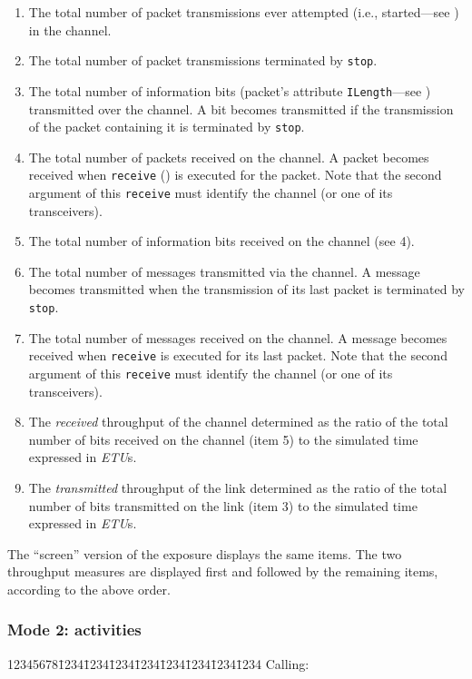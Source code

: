 \begin{enumerate}
\item
The total number of packet transmissions ever attempted (i.e., started---see
) in the channel.
\item
The total number of packet transmissions terminated by {\tt stop}.
\item
The total number of information bits (packet's attribute
{\tt ILength}---see ) transmitted over the channel.
A bit becomes transmitted if the transmission of the packet containing it
is terminated by {\tt stop}.
\item
The total number of packets received on the channel.
A packet becomes received when {\tt receive} () is executed
for the packet.
Note that the second argument of this {\tt receive} must identify the
channel (or one of its transceivers).
\item
The total number of information bits received on the channel (see 4).
\item
The total number of messages transmitted via the channel.
A message becomes transmitted when the transmission of its last packet
is terminated by {\tt stop}.
\item
The total number of messages received on the channel.
A message becomes received when 
{\tt receive} is executed for its last packet.
Note that the second argument of this {\tt receive} must identify the
channel (or one of its transceivers).
\item
The {\em received\/} throughput of the channel determined as the ratio of
the total number of bits received on the channel (item 5)
to the simulated time expressed in {\em ETU}s.
\item
The {\em transmitted\/} throughput of the link determined as the ratio of
the total number of bits transmitted on the link (item 3)
to the simulated time expressed in {\em ETU}s.
\end{enumerate}

The ``screen'' version of the exposure displays the same items.
The two throughput measures are displayed first and followed by the
remaining items, according to the above order.

\subsubsection*{Mode 2: activities}

{\tt\begin{tabbing}
12345678\=1234\=1234\=1234\=1234\=1234\=1234\=1234\=1234\kill
{\rm Calling:}
\end{tabbing}}

